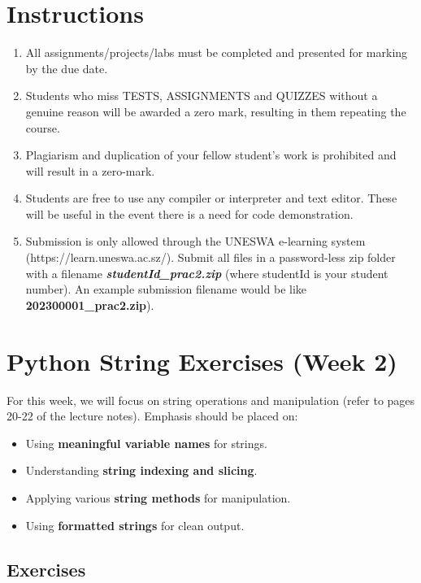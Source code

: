 \documentclass[a4paper,11pt]{article}
\theoremstyle{mytheor}
\begin{document}
\section*{Instructions} 
\begin{enumerate}
    \item All assignments/projects/labs must be completed and presented for marking by the due date. 
    \item Students who miss TESTS, ASSIGNMENTS and QUIZZES without a genuine reason will be awarded a zero mark, resulting in them repeating the course.
    \item Plagiarism and duplication of your fellow student's work is prohibited and will result in a zero-mark.
    \item Students are free to use any compiler or interpreter and text editor. These will be useful in the event there is a need for code demonstration. 
    \item Submission is only allowed through the UNESWA e-learning system (https://learn.uneswa.ac.sz/). Submit all files in a password-less zip folder with a filename \textbf{\textit{studentId\_prac2.zip}} (where studentId is your student number). An example submission filename would be like \textbf{202300001\_prac2.zip}).
\end{enumerate} 
  
\section*{Python String Exercises (Week 2)}

For this week, we will focus on string operations and manipulation (refer to pages 20-22 of the lecture notes).  
Emphasis should be placed on:
\begin{itemize}
    \item Using \textbf{meaningful variable names} for strings.
    \item Understanding \textbf{string indexing and slicing}.
    \item Applying various \textbf{string methods} for manipulation.
    \item Using \textbf{formatted strings} for clean output.
\end{itemize}

\subsection*{Exercises}
\end{document}
